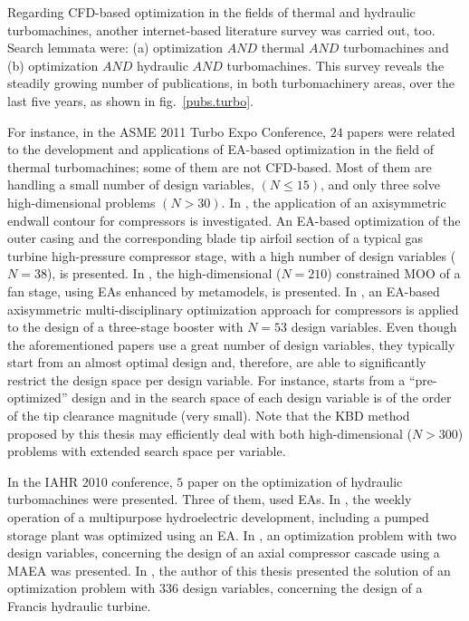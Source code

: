 Regarding CFD-based optimization in the fields of thermal and hydraulic turbomachines, another internet-based literature survey was carried out, too. Search lemmata were: (a) optimization $AND$ thermal $AND$ turbomachines and (b) optimization $AND$ hydraulic $AND$ turbomachines. This survey reveals the steadily growing number of publications, in both turbomachinery areas, over the last five years, as shown in fig.\ \ref{pubs.turbo}. 

For instance, in the ASME 2011 Turbo Expo Conference, $24$ papers were related to the development and applications of EA-based optimization in the field of thermal turbomachines; some of them are not CFD-based. Most of them are handling a small number of design variables, $(N\!\leq\!15)$, and only three \cite{Georg2011,Marcel2011,Kevin2011} solve high-dimensional problems $(N\!>\!30)$. In \cite{Georg2011}, the application of an axisymmetric endwall contour for compressors is investigated. An EA-based optimization of the outer casing and the corresponding blade tip airfoil section of a typical gas turbine high-pressure compressor stage, with a high number of design variables ($N\!=\!38$), is presented. In \cite{Marcel2011}, the high-dimensional ($N\!=\!210$) constrained MOO of a fan stage, using EAs enhanced by metamodels, is presented. In \cite{Kevin2011}, an EA-based axisymmetric multi-disciplinary optimization approach for compressors is  applied to the design of a three-stage booster with $N\!=\!53$ design variables. Even though the aforementioned papers use a great number of design variables, they typically start from an almost optimal design and, therefore, are able to significantly restrict the design space per design variable. For instance,  \cite{Marcel2011} starts from a ``pre-optimized'' design and in \cite{Georg2011} the search space of each design variable is of the order of the tip clearance magnitude (very small). Note that the KBD method proposed by this thesis may efficiently deal with both high-dimensional ($N\!>\!300$) problems with extended search space per variable.      

In the IAHR 2010 conference, $5$ paper on the optimization of hydraulic turbomachines were presented. Three of them,  \cite{Raimunda2010,Kyriacou2010,Popa2010} used EAs. In \cite{Popa2010}, the weekly operation of a multipurpose
hydroelectric development, including a pumped storage plant was optimized using an EA. In \cite{Raimunda2010}, an optimization problem with two design variables, concerning the design of an axial compressor cascade using a MAEA was presented.  In \cite{Kyriacou2010}, the author of this thesis presented the solution of an optimization problem with $336$ design variables, concerning the design of a Francis hydraulic turbine. 


